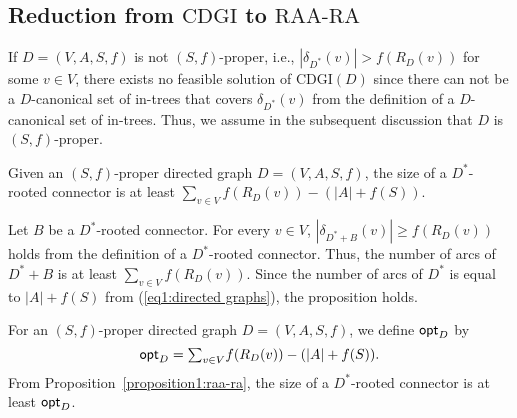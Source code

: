 \documentclass[11pt]{article}
\newcounter{ni}
\theoremstyle{plain}
\newcommand{\eop}{\hfill \usebox{\ProofSym}}
\newenvironment{proof}{\noindent {\it Proof.}}{\eop\par\vspace{0.3cm}}
\begin{document}
\subsection{Reduction from $\mbox{CDGI}$ to $\mbox{RAA-RA}$}
\label{Reduction from CDGI to RAA-RA}

If $D=(V,A,S,f)$ is not $(S,f)$-proper, i.e., 
$|\delta_{D^{\ast}}(v)|>f(R_D(v))$ for some $v \in V$,  
there exists no feasible solution of $\mbox{CDGI}(D)$ 
since there can not be a $D$-canonical set of in-trees 
that covers $\delta_{D^{\ast}}(v)$ 
from the definition of a $D$-canonical set of in-trees.  
Thus, we assume in the subsequent discussion that $D$ is $(S,f)$-proper. 

\begin{proposition} \label{proposition1:raa-ra}
Given an $(S,f)$-proper directed graph $D=(V,A,S,f)$, 
the size of a $D^{\ast}$-rooted connector is at least 
$\mbox{$\sum$}_{v \in V}f(R_D(v)) - (|A|+f(S))$.
\end{proposition}
\begin{proof}
Let $B$ be a $D^{\ast}$-rooted connector. 
For every $v\in V$, $|\delta_{D^{\ast}+B}(v)|\ge f(R_D(v))$ holds 
from the definition of a $D^{\ast}$-rooted connector.
Thus, the number of arcs of $D^{\ast}+B$ is at least $\sum_{v \in V}f(R_D(v))$. 
Since the number of arcs of $D^{\ast}$ is equal to 
$|A|+f(S)$ from (\ref{eq1:directed graphs}), the proposition holds. 
\end{proof}
For an $(S,f)$-proper directed graph $D=(V,A,S,f)$, we define ${\sf opt}_D$ by 
\begin{equation} \label{eq1:rooted}
{\sf opt}_D=\mbox{$\sum$}_{v \in V}f(R_D(v)) - (|A|+f(S)).
\end{equation}
From Proposition~\ref{proposition1:raa-ra}, the size of a $D^{\ast}$-rooted 
connector is at least ${\sf opt}_D$. 
\end{document}
